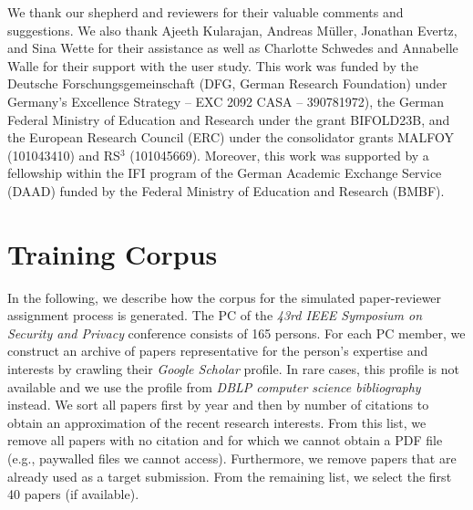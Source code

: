\documentclass[letterpaper,twocolumn,10pt]{article}
\begin{document}
We thank our shepherd and reviewers for their valuable comments and suggestions. We also thank Ajeeth Kularajan, Andreas Müller, Jonathan Evertz, and Sina Wette for their assistance as well as Charlotte Schwedes and Annabelle Walle for their support with the user study. 
This work was funded by the Deutsche Forschungsgemeinschaft (DFG, German Research Foundation) under Germany's Excellence Strategy -- EXC 2092 CASA -- 390781972), the German Federal Ministry of Education and Research under the grant BIFOLD23B, and
the European Research Council (ERC) under the consolidator grants MALFOY (101043410) and RS$^3$ (101045669).
Moreover, this work was supported by a fellowship within the IFI program of the German Academic Exchange Service (DAAD) funded by the Federal Ministry of Education and Research (BMBF).
 



\let\oldthebibliography\thebibliography
\let\endoldthebibliography\endthebibliography
\renewenvironment{thebibliography}[1]{
  \begin{oldthebibliography}{#1}
    \setlength{\itemsep}{0.0em}
    \setlength{\parskip}{0.0em}
}
{
  \end{oldthebibliography}
}

{\footnotesize}

\appendix
\section{Training Corpus}
\label{app:corpus}
\vspace{-0.5em}

In the following, we describe how the corpus for the simulated paper-reviewer assignment process is generated. 
The PC of the \emph{43rd IEEE Symposium on Security and Privacy} conference consists of 165 persons. For each PC member, we construct an archive of papers representative for the person's expertise and interests by crawling their \emph{Google Scholar} profile. In rare cases, this profile is not available and we use the profile from \emph{DBLP computer science bibliography} instead. We sort all papers first by year and then by number of citations to obtain an approximation of the recent research interests. From this list, we remove all papers with no citation and for which we cannot obtain a PDF file (e.g., paywalled files we cannot access). Furthermore, we remove papers that are already used as a target submission. From the remaining list, we select the first 40 papers (if available). 
\end{document}
